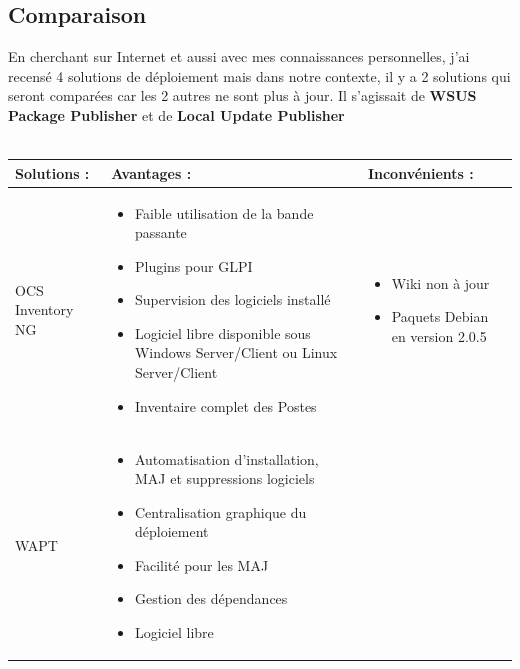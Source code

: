 \documentclass[11pt,a4paper,oneside]{article}
\begin{document}
\subsection{Comparaison}
En cherchant sur Internet et aussi avec mes connaissances personnelles, j'ai recensé 4 solutions de déploiement mais dans notre contexte, il y a 2 solutions qui seront comparées car les 2 autres ne sont plus à jour. Il s'agissait de \textbf{WSUS Package Publisher} et de \textbf{Local Update Publisher} \\ \\
\begin{tabular}{|p{3.1cm}|p{6.5cm}|p{6.5cm}|}
	\hline
	\centering Solutions : & \centering Avantages : & Inconvénients : \\
	\hline
	\centering OCS Inventory NG  & \begin{itemize}
							\item Faible utilisation de la bande passante 
							\item Plugins pour GLPI							
							\item Supervision des logiciels installé
							\item Logiciel libre disponible sous Windows Server/Client ou Linux Server/Client
							\item Inventaire complet des Postes							
						\end{itemize} & \begin{itemize}
												\item Wiki non à jour  
												\item Paquets Debian en version 2.0.5																			\end{itemize} \\
	\hline
	\centering WAPT  & \begin{itemize}
							\item Automatisation d'installation, MAJ et suppressions logiciels 
							\item Centralisation graphique du déploiement
							\item Facilité pour les MAJ 
							\item Gestion des dépendances
							\item Logiciel libre													

\end{itemize}
\end{tabular}
\end{document}

